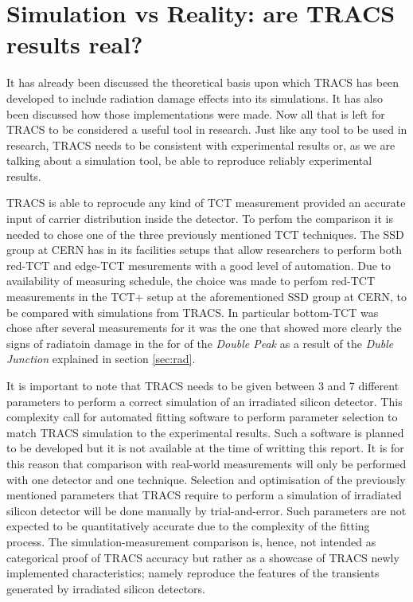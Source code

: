 \chapter{Simulation vs Reality: are TRACS results real?}

It has already been discussed the theoretical basis upon which TRACS has been developed to include radiation damage effects into its simulations. It has also been discussed how those implementations were made. Now all that is left for TRACS to be considered a useful tool in research. Just like any tool to be used in research, TRACS needs to be consistent with experimental results or, as we are talking about a simulation tool, be able to reproduce reliably experimental results.

TRACS is able to reprocude any kind of TCT measurement provided an accurate input of carrier distribution inside the detector. To perfom the comparison it is needed to chose one of the three previously mentioned TCT techniques. The SSD group at CERN has in its facilities setups that allow researchers to perform both red-TCT and edge-TCT mesurements with a good level of automation. Due to availability of measuring schedule, the choice was made to perfom red-TCT measurements in the TCT+ setup at the aforementioned SSD group at CERN, to be compared with simulations from TRACS. In particular bottom-TCT was chose after several measurements for it was the one that showed more clearly the signs of radiatoin damage in the for of the \textit{Double Peak} as a result of the \textit{Duble Junction} explained in section \ref{sec:rad}. 

It is important to note that TRACS needs to be given between 3 and 7 different parameters to perform a correct simulation of an irradiated silicon detector. This complexity call for automated fitting software to perform parameter selection to match TRACS simulation to the experimental results. Such a software is planned to be developed but it is not available at the time of writting this report. It is for this reason that comparison with real-world measurements will only be performed with one detector and one technique. Selection and optimisation of the previously mentioned parameters that TRACS require to perform a simulation of irradiated silicon detector will be done manually by trial-and-error. Such parameters are not expected to be quantitatively accurate due to the complexity of the fitting process. The simulation-measurement comparison is, hence, not intended as categorical proof of TRACS accuracy but rather as a showcase of TRACS newly implemented characteristics; namely reproduce the features of the transients generated by irradiated silicon detectors.


